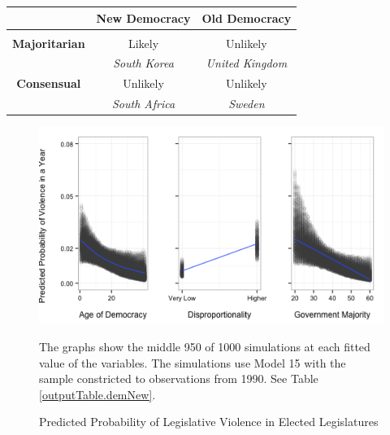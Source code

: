 \documentclass[a4paper]{article}\usepackage{graphicx, color}
\newenvironment{knitrout}{}{} %
\begin{document}
{{\begin{table}[!h]
\begin{center}
\begin{tabular}{c | c c}
        & {\bf{New Democracy}} & {\bf{Old Democracy}} \\[0.25cm]
        \hline \\[0.25cm]
        {\bf{Majoritarian}} & Likely & Unlikely \\[0.25cm]
        & {\emph{South Korea}} & {\emph{United Kingdom}} \\[0.5cm]
        {\bf{Consensual}} & Unlikely & Unlikely \\[0.25cm]
         & {\emph{South Africa}} & {\emph{Sweden}} \\[0.25cm]
        \hline

    \end{tabular}
    \end{center}
\end{table}





\begin{figure}[t]
    \caption{Predicted Probability of Legislative Violence in Elected Legislatures}  
    \label{pred_prob}
    \begin{center}


\begin{knitrout}
\color{fgcolor}\includegraphics[width=0.8\linewidth]{figure/predProb} 
\end{knitrout}

    \end{center}
    \begin{singlespace}
      {\scriptsize{The graphs show the middle 950 of 1000 simulations at each fitted value of the variables. The simulations use Model 15 with the sample constricted to observations from 1990. See Table \ref{outputTable.demNew}.}}
    \end{singlespace}
\end{figure}

}}
\end{document}
